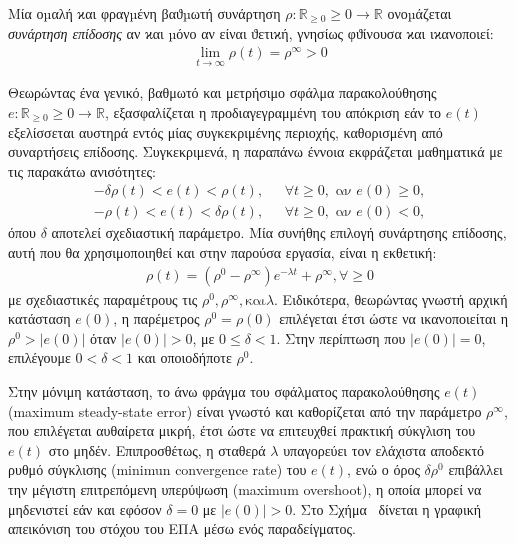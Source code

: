 \bigskip
\begin{definition} \label{Definition_PPC}
Μία οµαλή ϰαι φραγµένη βαϑµωτή συνάρτηση $\rho : \mathbb{R}_{\geq0} \geq 0 \rightarrow \mathbb{R}$ ονοµάζεται \textit{συνάρτηση επίδοσης} αν ϰαι µόνο αν είναι ϑετιϰή, γνησίως φϑίνουσα ϰαι ιϰανοποιεί:	
\begin{gather}
  \lim_{t\rightarrow\infty}\rho(t) = \rho^{\infty}>0 \label{rho_lim}
\end{gather}

Θεωρώντας ένα γενικό, βαθμωτό και μετρήσιμο σφάλμα παρακολούθησης $e: \mathbb{R}_{\geq0} \geq 0 \rightarrow \mathbb{R}$, εξασφαλίζεται η προδιαγεγραμμένη του απόκριση εάν το $e(t)$ εξελίσσεται αυστηρά εντός μίας συγκεκριμένης περιοχής, καθορισμένη από συναρτήσεις επίδοσης. Συγκεκριμενά, η παραπάνω έννοια εκφράζεται μαθηματικά με τις παρακάτω ανισότητες:
\begin{align}
  -\delta\rho(t) < e(t) < \rho(t),\text{ }&\forall t \geq 0,\text{ αν } e(0) \geq 0, \label{rho_relation_for_positive_e}\\
  -\rho(t) < e(t) < \delta\rho(t),\text{ } &\forall t \geq 0,\text{ αν } e(0) < 0, \label{rho_relation_for_negative_e}
\end{align}
όπου $\delta$ αποτελεί σχεδιαστική παράμετρο. Μία συνήθης επιλογή συνάρτησης επίδοσης, αυτή που θα χρησιμοποιηθεί και στην παρούσα εργασία, είναι η εκθετική:
\begin{gather}
  \rho(t) = (\rho^{0} - \rho^{\infty})e^{-\lambda t} + \rho^{\infty}, \forall \geq 0 \label{selected_rho}
\end{gather}
με σχεδιαστικές παραμέτρους τις $\rho^0, \rho^\infty, \text{και} \lambda$. Ειδικότερα, θεωρώντας γνωστή αρχική κατάσταση $e(0)$, η παρέμετρος $\rho^{0} = \rho(0)$ επιλέγεται έτσι ώστε να ικανοποιείται η $\rho^{0} > |e(0)|$  όταν $|e(0)|>0$, με $0 \leq \delta < 1$. Στην περίπτωση που $|e(0)| = 0 $, επιλέγουμε $0<\delta<1$ και οποιοδήποτε $\rho^{0}$.

\bigskip
Στην μόνιμη κατάσταση, το άνω φράγμα του σφάλματος παρακολούθησης $e(t)$ (maximum steady-state error) είναι γνωστό και καθορίζεται από την παράμετρο $\rho^{\infty}$, που επιλέγεται αυθαίρετα μικρή, έτσι ώστε να επιτευχθεί πρακτική σύκγλιση του $e(t)$ στο μηδέν. Επιπροσθέτως, η σταθερά $\lambda$ υπαγορεύει τον ελάχιστα αποδεκτό ρυθμό σύγκλισης (minimun convergence rate) του $e(t)$, ενώ ο όρος $\delta\rho^0$ επιβάλλει την μέγιστη επιτρεπόμενη υπερύψωση (maximum overshoot), η οποία μπορεί να μηδενιστεί εάν και εφόσον $\delta = 0$ με $|e(0)| > 0$. Στο Σχήμα~ δίνεται η γραφική απεικόνιση του στόχου του ΕΠΑ μέσω ενός παραδείγματος.


\end{definition}
